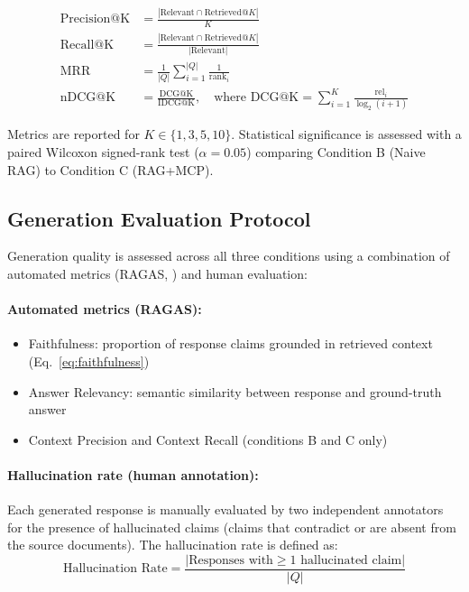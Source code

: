 \begin{align}
\text{Precision@K} &= \frac{|\text{Relevant} \cap \text{Retrieved}@K|}{K} \label{eq:precision}\\[6pt]
\text{Recall@K} &= \frac{|\text{Relevant} \cap \text{Retrieved}@K|}{|\text{Relevant}|} \label{eq:recall}\\[6pt]
\text{MRR} &= \frac{1}{|Q|} \sum_{i=1}^{|Q|} \frac{1}{\text{rank}_i} \label{eq:mrr}\\[6pt]
\text{nDCG@K} &= \frac{\text{DCG@K}}{\text{IDCG@K}}, \quad \text{where DCG@K} = \sum_{i=1}^{K} \frac{\text{rel}_i}{\log_2(i+1)} \label{eq:ndcg}
\end{align}

Metrics are reported for $K \in \{1, 3, 5, 10\}$. Statistical significance is assessed with a paired Wilcoxon signed-rank test \citep{Wilcoxon1945} ($\alpha = 0.05$) comparing Condition B (Naive RAG) to Condition C (RAG+MCP).

\subsection{Generation Evaluation Protocol}

Generation quality is assessed across all three conditions using a combination of automated metrics (RAGAS, \citealp{Es2023RAGAS}) and human evaluation:

\paragraph{Automated metrics (RAGAS):}
\begin{itemize}
  \item Faithfulness: proportion of response claims grounded in retrieved context (Eq.~\ref{eq:faithfulness})
  \item Answer Relevancy: semantic similarity between response and ground-truth answer
  \item Context Precision and Context Recall (conditions B and C only)
\end{itemize}

\paragraph{Hallucination rate (human annotation):}
Each generated response is manually evaluated by two independent annotators for the presence of hallucinated claims (claims that contradict or are absent from the source documents). The hallucination rate is defined as:
\begin{equation}
  \text{Hallucination Rate} = \frac{|\text{Responses with} \geq 1 \text{ hallucinated claim}|}{|Q|}
  \label{eq:hallucination}
\end{equation}


